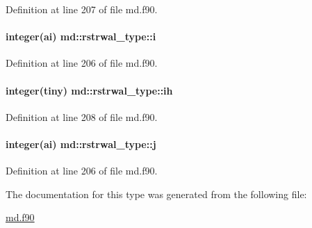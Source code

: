 Definition at line 207 of file md.\-f90.

\hypertarget{structmd_1_1rstrwal__type_a5e11f9213df5922386a41f1211686a6d}{
\paragraph[{i}]{\setlength{\rightskip}{0pt plus 5cm}integer(ai) md\-::rstrwal\-\_\-type\-::i}}\label{structmd_1_1rstrwal__type_a5e11f9213df5922386a41f1211686a6d}


Definition at line 206 of file md.\-f90.

\hypertarget{structmd_1_1rstrwal__type_a81a6abbcf02e2b7ad1088a2c369bc157}{
\paragraph[{ih}]{\setlength{\rightskip}{0pt plus 5cm}integer(tiny) md\-::rstrwal\-\_\-type\-::ih}}\label{structmd_1_1rstrwal__type_a81a6abbcf02e2b7ad1088a2c369bc157}


Definition at line 208 of file md.\-f90.

\hypertarget{structmd_1_1rstrwal__type_a5c975c9f2767cc314b21ca950d772a21}{
\paragraph[{j}]{\setlength{\rightskip}{0pt plus 5cm}integer(ai) md\-::rstrwal\-\_\-type\-::j}}\label{structmd_1_1rstrwal__type_a5c975c9f2767cc314b21ca950d772a21}


Definition at line 206 of file md.\-f90.



The documentation for this type was generated from the following file\-:\begin{DoxyCompactItemize}
\item 
\hyperlink{md_8f90}{md.\-f90}\end{DoxyCompactItemize}
